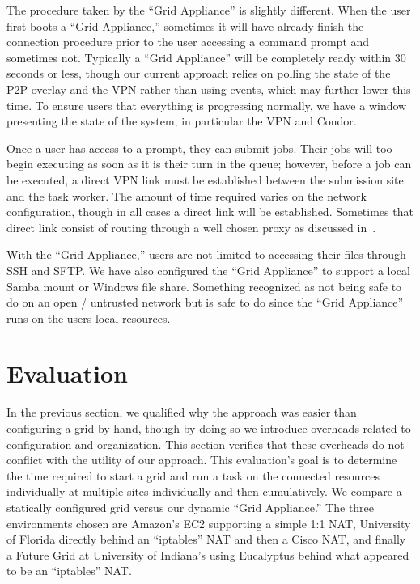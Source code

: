 \documentclass[conference]{IEEEtran}
\begin{document}
The procedure taken by the ``Grid Appliance'' is slightly different.  When the
user first boots a ``Grid Appliance,'' sometimes it will have already finish
the connection procedure prior to the user accessing a command prompt and
sometimes not.  Typically a ``Grid Appliance'' will be completely ready within
30 seconds or less, though our current approach relies on polling the state of
the P2P overlay and the VPN rather than using events, which may further lower
this time.  To ensure users that everything is progressing normally, we have a
window presenting the state of the system, in particular the VPN and Condor.

Once a user has access to a prompt, they can submit jobs.  Their jobs will too
begin executing as soon as it is their turn in the queue; however, before a job
can be executed, a direct VPN link must be established between the submission
site and the task worker.  The amount of time required varies on the network
configuration, though in all cases a direct link will be established.
Sometimes that direct link consist of routing through a well chosen proxy as
discussed in~\cite{groupvpn}.

With the ``Grid Appliance,'' users are not limited to accessing their files
through SSH and SFTP.  We have also configured the ``Grid Appliance'' to
support a local Samba mount or Windows file share.  Something recognized as not
being safe to do on an open / untrusted network but is safe to do since the
``Grid Appliance'' runs on the users local resources.

\section{Evaluation}
\label{evaluation}

In the previous section, we qualified why the approach was easier than
configuring a grid by hand, though by doing so we introduce overheads related
to configuration and organization.  This section verifies that these overheads
do not conflict with the utility of our approach.  This evaluation's goal is to
determine the time required to start a grid and run a task on the connected
resources individually at multiple sites individually and then cumulatively.
We compare a statically configured grid versus our dynamic ``Grid Appliance.''
The three environments chosen are Amazon's EC2 supporting a simple 1:1 NAT,
University of Florida directly behind an ``iptables'' NAT and then a Cisco NAT,
and finally a Future Grid at University of Indiana's using Eucalyptus behind
what appeared to be an ``iptables'' NAT.
\end{document}
